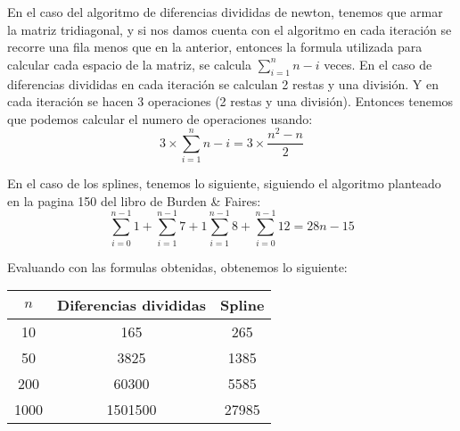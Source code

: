 
En el caso del algoritmo de diferencias divididas de newton, tenemos que armar la matriz tridiagonal, y si nos damos cuenta con el algoritmo en cada iteración se recorre una fila menos que en la anterior, entonces la formula utilizada para calcular cada espacio de la matriz, se calcula  
$\sum\nolimits_{i=1}^n n-i$ veces. 
 En el caso de diferencias divididas en cada iteración se calculan 2 restas y una división. Y en cada iteración se hacen 3 operaciones (2 restas y una división). Entonces tenemos que podemos calcular el numero de operaciones usando:
\begin{equation*}
	3 \times \sum\limits_{i=1}^n n-i = 3\times \frac{n^2 - n}{2}
\end{equation*}

En el caso de los splines, tenemos lo siguiente, siguiendo el algoritmo planteado en la pagina 150 del libro de Burden \& Faires:
\begin{equation*}
	\sum\limits_{i=0}^{n-1} 1 + \sum\limits_{i=1}^{n-1} 7 + 1\sum\limits_{i=1}^{n-1} 8 + \sum\limits_{i=0}^{n-1} 12
	=
	28n - 15
\end{equation*}

Evaluando con las formulas obtenidas, obtenemos lo siguiente:
\begin{center}
	\begin{longtable}{|c||c|c|} \hline
		$n$   & Diferencias divididas & Spline \\ \hline \hline
		10    & 165     & 265   \\ \hline
		50    & 3825    & 1385  \\ \hline
		200   & 60300   & 5585  \\ \hline
		1000  & 1501500 & 27985 \\ \hline
		
		
	\end{longtable}
\end{center}